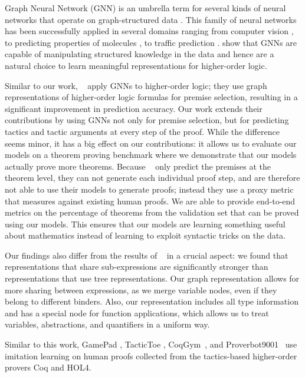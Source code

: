 \documentclass[letterpaper]{article} \usepackage{aaai20}  \usepackage{times}  \usepackage{helvet} \usepackage{courier}  \usepackage[hyphens]{url}  \usepackage{graphicx} \urlstyle{rm} \def\UrlFont{\rm}  \usepackage{graphicx}  \frenchspacing  \setlength{\pdfpagewidth}{8.5in}  \setlength{\pdfpageheight}{11in}
\newcommand{\citet}[1]{\citeauthor{#1}~\shortcite{#1}}
\newcommand{\citep}{\cite}
\begin{document}
Graph Neural Network (GNN) is an umbrella term for several kinds of neural networks that operate on graph-structured data \citep{gnn_survey_2019,GilmerSRVD17,xu2019powerful}. This family of neural networks has been successfully applied in several domains ranging from computer vision \citep{RaposoSBPLB17,SantoroRBMPBL17}, to predicting properties of molecules \citep{GilmerSRVD17}, to traffic prediction \citep{LiYSL17}.
\cite{battaglia_survey} show that GNNs are capable of manipulating structured knowledge in the data and hence are a natural choice to learn meaningful representations for higher-order logic.

Similar to our work, \citet{wang2017premise} apply GNNs to higher-order logic; they use graph representations of higher-order logic formulas for premise selection, resulting in a significant improvement in prediction accuracy.
Our work extends their contributions by using GNNs not only for premise selection, but for predicting tactics and tactic arguments at every step of the proof.
While the difference seems minor, it has a big effect on our contributions: it allows us to evaluate our models on a theorem proving benchmark where we demonstrate that our models actually prove more theorems. Because \citet{wang2017premise} only predict the premises at the theorem level, they can not generate each individual proof step, and are therefore not able to use their models to generate proofs; instead they use a proxy metric that measures against existing human proofs. We are able to provide end-to-end metrics on the percentage of theorems from the validation set that can be proved using our models.
This ensures that our models are learning something useful about mathematics instead of learning to exploit syntactic tricks on the data.

Our findings also differ from the results of \citet{wang2017premise} in a crucial aspect: we found that representations that share sub-expressions are significantly stronger than representations that use tree representations.
Our graph representation allows for more sharing between expressions, as we merge variable nodes, even if they belong to different binders.
Also, our representation includes all type information and has a special node for function applications, which allows us to treat variables, abstractions, and quantifiers in a uniform way.

Similar to this work, GamePad \citep{huang2018gamepad}, TacticToe \citep{gauthier2017tactictoe}, CoqGym~\citep{YangDeng/2019/LearningToProveTheoremsViaInteractingWithProofAssistants}, and Proverbot9001~\citep{SanchezSternAlhessiSaulLerner/2019/GeneratingCorrectnessProofsWithNNNs} use imitation learning on human proofs collected from the tactics-based higher-order provers Coq and HOL4.
\end{document}
